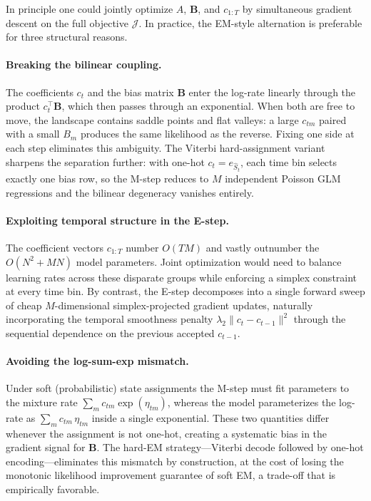 \documentclass[11pt]{article}
\begin{document}
In principle one could jointly optimize \(A\), \(\mathbf{B}\), and
\(c_{1:T}\) by simultaneous gradient descent on the full objective
\(\mathcal{J}\).  In practice, the EM-style alternation is preferable
for three structural reasons.

\paragraph{Breaking the bilinear coupling.}
The coefficients \(c_t\) and the bias matrix \(\mathbf{B}\) enter the
log-rate linearly through the product \(c_t^\top\mathbf{B}\), which
then passes through an exponential.  When both are free to move, the
landscape contains saddle points and flat valleys: a large \(c_{tm}\)
paired with a small \(B_m\) produces the same likelihood as the
reverse.  Fixing one side at each step eliminates this ambiguity.  The
Viterbi hard-assignment variant sharpens the separation further:
with one-hot \(c_t = e_{\hat{S}_t}\), each time bin selects exactly one
bias row, so the M-step reduces to \(M\) independent Poisson GLM
regressions and the bilinear degeneracy vanishes entirely.

\paragraph{Exploiting temporal structure in the E-step.}
The coefficient vectors \(c_{1:T}\) number \(O(TM)\) and vastly
outnumber the \(O(N^2+MN)\) model parameters.  Joint optimization
would need to balance learning rates across these disparate groups
while enforcing a simplex constraint at every time bin.  By contrast,
the E-step decomposes into a single forward sweep of cheap
\(M\)-dimensional simplex-projected gradient updates, naturally
incorporating the temporal smoothness penalty
\(\lambda_2\|c_t-c_{t-1}\|^2\) through the sequential dependence on the
previous accepted \(c_{t-1}\).

\paragraph{Avoiding the log-sum-exp mismatch.}
Under soft (probabilistic) state assignments the M-step must fit
parameters to the mixture rate
\(\sum_m c_{tm}\exp(\eta_{tm})\), whereas the model parameterizes the
log-rate as \(\sum_m c_{tm}\,\eta_{tm}\) inside a single exponential.
These two quantities differ whenever the assignment is not one-hot,
creating a systematic bias in the gradient signal for \(\mathbf{B}\).
The hard-EM strategy—Viterbi decode followed by one-hot
encoding—eliminates this mismatch by construction, at the cost of
losing the monotonic likelihood improvement guarantee of soft EM, a
trade-off that is empirically favorable.
\end{document}
